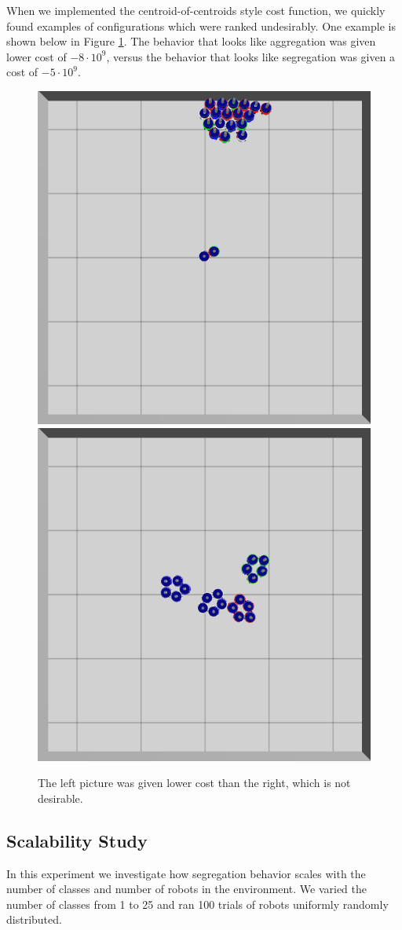 \documentclass[conference]{IEEEtran}
\begin{document}
    When we implemented the centroid-of-centroids style cost function, we quickly found examples of configurations which were ranked undesirably. One example is shown below in Figure \ref{fig:cost_function_fuckup}. The behavior that looks like aggregation was given lower cost of $-8\cdot 10^{9}$, versus the behavior that looks like segregation was given a cost of $-5\cdot 10^{9}$.

    \begin{figure}[H]
      \centering
      \includegraphics[width=0.49\linewidth]{./images/individual_0_gen_0.png}
      \includegraphics[width=0.49\linewidth]{./images/individual_0_gen_1_better.png}
      \caption{The left picture was given lower cost than the right, which is not desirable.}
      \label{fig:cost_function_fuckup}
    \end{figure}

  \subsection{Scalability Study} \label{section:scalability}

    In this experiment we investigate how segregation behavior scales with the number of classes and number of robots in the environment. We varied the number of classes from 1 to 25 and ran 100 trials of robots uniformly randomly distributed.
\end{document}
